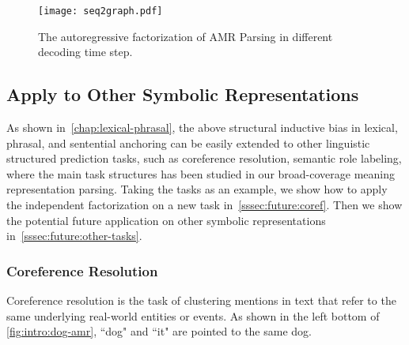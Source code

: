 \begin{figure}[h]
\centering
\texttt{[image: seq2graph.pdf]}
\caption{\label{fig:autoreg-example}The autoregressive factorization
  of AMR Parsing in different decoding time step.}
\end{figure}

\subsection{Apply to Other Symbolic Representations}
\label{ssec:future:other-application}

As shown in~\autoref{chap:lexical-phrasal}, the above structural
inductive bias in lexical, phrasal, and sentential anchoring can be
easily extended to other linguistic structured prediction tasks, such
as coreference resolution, semantic role labeling, where the main task
structures has been studied in our broad-coverage meaning
representation parsing. Taking the  tasks
as an example, we show how to apply the independent factorization on a
new task in~\autoref{sssec:future:coref}. Then we show the potential
future application on other symbolic representations
in~\autoref{sssec:future:other-tasks}.

\subsubsection[Coreference Resolution]{Coreference Resolution}
\label{sssec:future:coref}
 Coreference resolution is the task of clustering mentions in
text that refer to the same underlying real-world entities or
events. As shown in the left bottom of \autoref{fig:intro:dog-amr},
``dog" and ``it" are pointed to the same dog.

